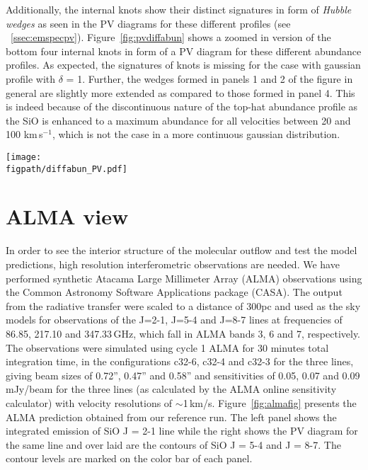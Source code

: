 \documentclass[useAMS,usenatbib]{mn2e}
\newcommand{\figpath}{/Users/bhargavvaidya/MyProject/work/Leeds_Uni/SiOJets_New/PAPER/PFIGS/}
\begin{document}
Additionally, the internal knots show their distinct signatures in
form of {\em Hubble wedges} as seen in the PV diagrams for these
different profiles (see
~\ref{ssec:emspecpv}). Figure~\ref{fig:pvdiffabun} shows a zoomed in
version of the bottom four internal knots in form of a PV diagram for these
different abundance profiles. As expected, the signatures of knots 
is missing for the case with gaussian profile with $\delta$ =
1. Further, the wedges formed in panels 1 and 2 of the figure in
general are slightly more extended as compared to those
formed in panel 4. This is indeed because of the
discontinuous nature of the top-hat abundance profile as the SiO is
enhanced to a maximum abundance for all velocities between 20 and 100
km\,s$^{-1}$, which is not the case in a more continuous gaussian
distribution.

\begin{figure*}
 \texttt{[image: \\figpath/diffabun\_PV.pdf]}%
 \caption{Position-velocity maps of SiO(2-1) for the internal
   knots produced in the model with molecular
   cooling, $\eta$ = 3, $\beta$ = 10 and different abundance
   profiles. The contours mark different levels of emission in Kelvins, viz.,
   0.2,0.6,1.0,1.4,1.8,2.0,3.0,4.0.}
\label{fig:pvdiffabun}
\end{figure*}
   
 
\section{ALMA view}
\label{sec:ALMAview}
%
In order to see the interior structure of the molecular outflow and
test the model predictions, high
resolution interferometric observations are needed. 
We have performed synthetic Atacama Large Millimeter
Array (ALMA) observations using the Common Astronomy Software
Applications package (CASA). The output from the radiative transfer
were scaled to a distance of 300pc and used as the sky models for observations of
the J=2-1, J=5-4 and J=8-7 lines at frequencies of 86.85, 217.10 and
347.33$\,$GHz, which fall in ALMA bands 3, 6 and 7, respectively. The observations
were simulated using cycle 1 ALMA for 30 minutes total integration
time, in the configurations c32-6, c32-4 and c32-3 for the three
lines, giving beam sizes of 0.72'', 0.47'' and 0.58'' and
sensitivities of 0.05, 0.07 and 0.09$\,$mJy/beam for the three lines
(as calculated by the ALMA online sensitivity calculator) with
velocity resolutions of $\sim$1$\,$km/s.
 Figure~\ref{fig:almafig}
presents the ALMA prediction obtained from our reference run. The
left panel shows the integrated emission of SiO J = 2-1 line while the right
shows the PV diagram for the same line and over laid are
the contours of SiO J = 5-4 and J = 8-7. The contour levels are marked
on the color bar of each panel. 
\end{document}
